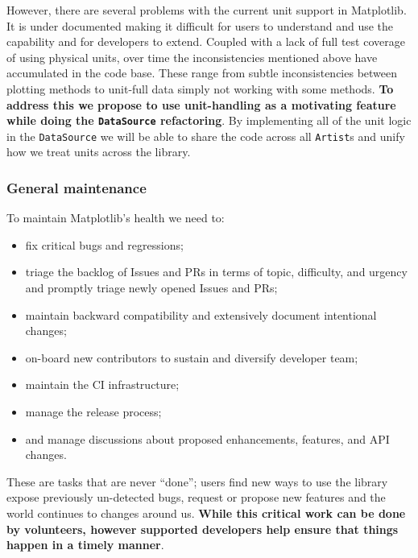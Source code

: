 \documentclass[12pt]{article}
\numberwithin{page}{section}
\begin{document}
However, there are several problems with the current unit support in
Matplotlib.  It is under documented making it difficult for users to
understand and use the capability and for developers to extend.
Coupled with a lack of full test coverage of using physical units,
over time the inconsistencies mentioned above have accumulated in the
code base.  These range from subtle inconsistencies between plotting
methods to unit-full data simply not working with some methods.
\textbf{To address this we propose to use unit-handling as a
  motivating feature while doing the \texttt{DataSource} refactoring}.
By implementing all of the unit logic in the \texttt{DataSource} we
will be able to share the code across all \texttt{Artist}s and unify
how we treat units across the library.


\subsubsection{General maintenance}

To maintain Matplotlib's health we need to:
\begin{itemize}[noitemsep]
\item fix critical bugs and regressions;
\item triage the backlog of Issues and PRs in terms of topic,
  difficulty, and urgency and promptly triage newly opened Issues and
  PRs;
\item maintain backward compatibility and extensively document
  intentional changes;
\item on-board new contributors to sustain and diversify developer
  team;
\item maintain the CI infrastructure;
\item manage the release process;
\item and manage discussions about proposed enhancements, features,
  and API changes.
\end{itemize}
These are tasks that are never ``done''; users find new ways to use
the library expose previously un-detected bugs, request or propose new
features and the world continues to changes around us.  \textbf{While
  this critical work can be done by volunteers, however supported
  developers help ensure that things happen in a timely manner}.


\end{document}
